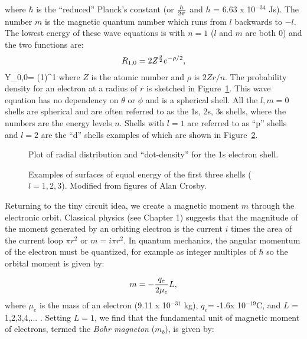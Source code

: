 \noindent where $\hbar$ is the ``reduced'' 
Planck's constant (or ${h\over{2\pi}}$ and $h$ = 6.63 x 10$^{-34}$ Js).  The number   $m$  is the 
magnetic quantum number which runs from $l$ backwards to $-l$.   The lowest energy of these wave equations is with $n=1$ ($l$ and $m$ are both 0) and the two functions are:
$$
R_{1,0} = 2  Z^{3\over 2}  e^{-\rho/2},
$$
\beq
Y_{0,0}=  ({1\over {4\pi}})^{1}
\eeq
\noindent where $Z$ is the atomic number and $\rho$ is $2Zr/n$.  The probability density for  an electron at a radius of $r$ is sketched in Figure~\ref{fig:1s}.  
This wave equation has no dependency on $\theta$ or $\phi$ and is a spherical 
shell.    All the $l,m=0$ shells are spherical and are often referred to as the 1s, 2s, 3s shells, where the numbers are the energy levels $n$.   Shells with $l=1$ are referred to as ``p'' shells and $l=2$ are the ``d'' shells examples of which are shown in Figure~\ref{fig:shells}.   


\begin{figure}[htb]
\epsfxsize 10cm
\centering {}
\caption{Plot of radial distribution and ``dot-density'' for the 1s electron shell.}
\label{fig:1s}
\end{figure}




\begin{figure}[h!tb]
\epsfxsize 12cm
\centering {}
\caption{Examples of surfaces of equal energy of the first three shells ($l=1,2,3$).   Modified from figures of Alan Crosby.    }
\label{fig:shells}
\end{figure}


Returning to the tiny circuit idea,  we create a 
magnetic moment $m$ through the 
electronic orbit. 
Classical physics (see Chapter 1) suggests that the magnitude of the moment generated
by an orbiting electron is the current $i$ times the area of the current loop $\pi r^2$ or $m= i  \pi r^2$.     In quantum mechanics,  the angular momentum of the electron must be quantized, for example as integer multiples of $\hbar$ so the  orbital  moment  is given by:

$$
m = -{ {q_e}\over {2\mu_e}}L,
$$
\noindent
where $\mu_e$ is the mass of an electron (9.11 x 10$^{-31}$ kg), $q_e$= -1.6x 10$^{-19}$C, and $L$ = 1,2,3,4,... .  Setting $L=1$,  we find that the fundamental
unit of magnetic moment of electrons, termed the 
{\it Bohr magneton} ($m_b$), is given by:

